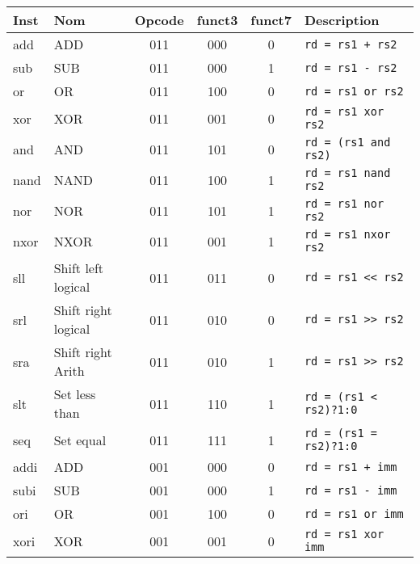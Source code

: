 \documentclass[a4paper]{article}
\begin{document}
    \begin{tabular}{|l|l|c|c|c|l|}
        \hline
        Inst  & Nom                  & Opcode & funct3 & funct7 & Description                   \\
        \hline
        add   & ADD                  & 011    & 000    & 0      & \texttt{rd = rs1 + rs2}       \\
        sub   & SUB                  & 011    & 000    & 1      & \texttt{rd = rs1 - rs2}       \\
        or    & OR                   & 011    & 100    & 0      & \texttt{rd = rs1 or rs2}      \\
        xor   & XOR                  & 011    & 001    & 0      & \texttt{rd = rs1 xor rs2}     \\
        and   & AND                  & 011    & 101    & 0      & \texttt{rd = (rs1 and rs2)}   \\
        nand  & NAND                 & 011    & 100    & 1      & \texttt{rd = rs1 nand rs2}    \\
        nor   & NOR                  & 011    & 101    & 1      & \texttt{rd = rs1 nor rs2}     \\
        nxor  & NXOR                 & 011    & 001    & 1      & \texttt{rd = rs1 nxor rs2}    \\
        sll   & Shift left logical   & 011    & 011    & 0      & \texttt{rd = rs1 << rs2}      \\
        srl   & Shift right logical  & 011    & 010    & 0      & \texttt{rd = rs1 >> rs2}      \\
        sra   & Shift right Arith    & 011    & 010    & 1      & \texttt{rd = rs1 >> rs2}      \\
        slt   & Set less than        & 011    & 110    & 1      & \texttt{rd = (rs1 < rs2)?1:0} \\
        seq   & Set equal            & 011    & 111    & 1      & \texttt{rd = (rs1 = rs2)?1:0} \\
        \hline
        addi  & ADD                  & 001    & 000    & 0      & \texttt{rd = rs1 + imm}       \\
        subi  & SUB                  & 001    & 000    & 1      & \texttt{rd = rs1 - imm}       \\
        ori   & OR                   & 001    & 100    & 0      & \texttt{rd = rs1 or imm}      \\
        xori  & XOR                  & 001    & 001    & 0      & \texttt{rd = rs1 xor imm}     \\

\end{tabular}
\end{document}
